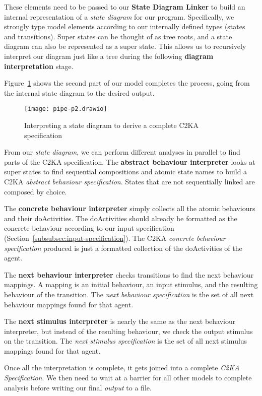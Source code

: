 These elements need to be passed to our \textbf{State Diagram Linker}
to build an internal representation of a \textit{state diagram} for our program.
Specifically, we strongly type model elements according to our internally defined types (states and transitions).
Super states can be thought of as tree roots, and a state diagram can also be represented as a super state.
This allows us to recursively interpret our diagram just like a tree during the following \textbf{diagram interpretation} stage.

Figure~\ref{fig:pipe-2} shows the second part of our model completes the process, going from the internal state diagram to the desired output.
\begin{figure}[ht]
    \centering
    \texttt{[image: pipe-p2.drawio]}
    \caption{Interpreting a state diagram to derive a complete C2KA specification}
    \label{fig:pipe-2}
\end{figure}

From our \textit{state diagram}, we can perform different analyses in parallel to find parts of the C2KA specification.
The \textbf{abstract behaviour interpreter} looks at super states to find sequential compositions
and atomic state names to build a C2KA \textit{abstract behaviour specification}.
States that are not sequentially linked are composed by choice.

The \textbf{concrete behaviour interpreter} simply collects all the atomic behaviours and their doActivities.
The doActivities should already be formatted as the concrete behaviour according to our input specification (Section~\ref{subsubsec:input-specification}).
The C2KA \textit{concrete behaviour specification} produced is just a formatted collection of the doActivities of the agent.

The \textbf{next behaviour interpreter} checks transitions to find the next behaviour mappings.
A mapping is an initial behaviour, an input stimulus, and the resulting behaviour of the transition.
The \textit{next behaviour specification} is the set of all next behaviour mappings found for that agent.

The \textbf{next stimulus interpreter} is nearly the same as the next behaviour interpreter,
but instead of the resulting behaviour, we check the output stimulus on the transition.
The \textit{next stimulus specification} is the set of all next stimulus mappings found for that agent.

Once all the interpretation is complete, it gets joined into a complete \textit{C2KA Specification}.
We then need to wait at a barrier for all other models to complete analysis before writing our final \textit{output} to a file.

